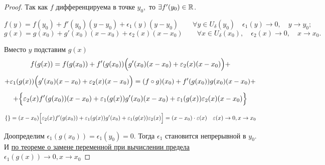 \begin{proof}
    Так как $f$ дифференцируема в точке $y_{0},$ то $\exists f'(y_{0}) \in \R$.

    $$f(y) = f(y_{0}) + f'(y_{0})(y-y_{0}) + \epsilon_{1}(y)(y-y_{0}) \quad  \quad   \forall y \in U_{\delta}(y_{0}) \quad \epsilon_{1}(y) \to 0,\quad y\to y_{0};$$
    $$g(x) = g(x_{0}) + g'(x_{0})(x-x_{0}) + \epsilon_{2}(x)(x-x_{0})  \quad \quad  \forall x \in U_{\delta}(x_{0}),\quad \epsilon_{2}(x) \to 0,\quad  x\to x_{0}.$$

    Вместо $y$ подставим $g(x)$
    $$
    f(g(x)) = f(g(x_{0})) + f'(g(x_{0}))\Bigl( g'(x_{0})(x-x_{0}) + \epsilon_{2}(x)(x-x_{0})\Bigr) +  $$
    $$
    + \epsilon_{1}(g(x))\Bigl(g'(x_{0})(x-x_{0}) + \epsilon_{2}(x)(x-x_{0})\Bigr) = (f\circ g)(x_{0}) + f'(g(x_{0}))g(x_{0})(x-x_{0}) + $$
    $$+ \Bigl\{ \epsilon_{2}(x)f'(g(x_{0}))(x-x_{0}) + \epsilon_{1}(g(x))g'(x_{0})(x-x_{0}) + \epsilon_{1}(g(x))\epsilon_{2}(x)(x-x_{0}) \Bigr\}$$

    $$
    \{\} = (x-x_{0})\Bigl[\epsilon_{2}(x)f'(g(x_{0})) + \epsilon_{1}(g(x))g'(x_{0}) + \epsilon_{1}(g(x))\epsilon_{2}(x) \Bigr] = (x - x_{0}) \cdot \epsilon(x) \quad \epsilon(x) \to 0, x\to x_{0}
    $$

    Доопределим $\epsilon_{1}(g(x_{0})) = \epsilon_{1}(y_{0}) = 0$. Тогда $\epsilon_{1}$ становится непрерывной в  $y_{0}.$ И \hyperlink{thrm4.18}{по теореме о замене переменной при вычислении предела} $\epsilon_{1}(g(x))\to 0, x\to x_{0}$
\end{proof}

